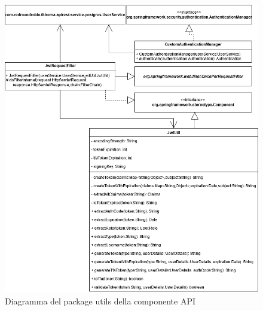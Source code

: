 		
		\begin{figure}[H]
			\centering
			\includegraphics[scale=0.550]{res/images/API/UtilsPackage.png}
			\caption{Diagramma del package utils della componente API}
			\label{Diagramma 11}
		\end{figure}
